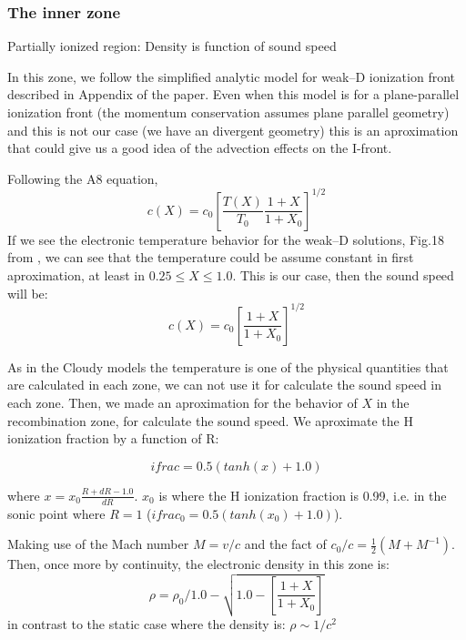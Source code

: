 \documentclass[aaspp]{article}
\newcommand{\R}{$\mathrm{R}$\xspace}
\begin{document}
\subsubsection{The inner zone}
\label{sec:inner}

Partially ionized region: Density is function of sound speed

In this zone, we follow the simplified analytic model for weak--D ionization front described in Appendix of the \citet{2005ApJ...621..328H} paper. Even when this model is for a plane-parallel ionization front (the momentum conservation assumes plane parallel geometry) and this is not our case (we have an divergent geometry) this is an aproximation that could give us a good idea of the advection effects on the I-front.

Following the A8 equation, 
\begin{equation}
  c(X) = c_0 \left [ \frac{T(X)}{T_0} \frac{1+X}{1+X_0}\right]^{1/2}
\end{equation}
If we see the electronic temperature behavior for the weak--D solutions, Fig.18 from \citet{2005ApJ...621..328H}, we can see that the temperature could be assume constant in first aproximation, at least in $0.25 \le X \le 1.0$. This is our case, then the sound speed will be:
\begin{equation}
  c(X) = c_0 \left [ \frac{1+X}{1+X_0}\right]^{1/2}
\end{equation}

As in the Cloudy models the temperature is one of the physical quantities that are calculated in each zone, we can not use it for calculate the sound speed in each zone. Then, we made an aproximation for the behavior of $X$ in the recombination zone, for calculate the sound speed. We aproximate the H ionization fraction by a function of \R:

\begin{equation}
  ifrac = 0.5 (tan h (x) + 1.0)
\end{equation}

where $x = x_0 \frac{R + dR -1.0}{dR}$. $x_0$ is where the H ionization fraction is 0.99, i.e. in the sonic point where $R = 1$ ($ifrac_0 = 0.5 (tan h (x_0) + 1.0)$).

Making use of the Mach number $M = v/c$ and the fact of $c_0/c = \frac{1}{2} \left ( M + M^{-1} \right)$. Then, once more by continuity, the electronic density in this zone is:
\begin{equation}
  \rho = \rho_0 / 1.0 - \sqrt{ 1.0 - \left [ \frac{1+X}{1+X_0} \right ]}
\end{equation}
in contrast to the static case where the density is: $\rho \sim 1/c^2$
\end{document}
